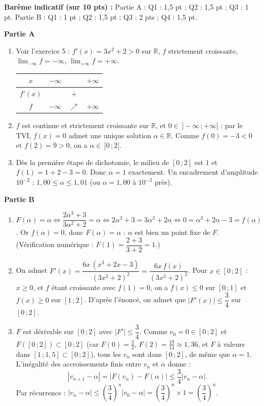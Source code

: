 \documentclass[11pt]{article}
\begin{document}
\begin{corrige}
\textbf{Barème indicatif (sur 10 pts) :} Partie A : Q1 : 1,5 pt ; Q2 : 1,5 pt ; Q3 : 1 pt. Partie B : Q1 : 1 pt ; Q2 : 1,5 pt ; Q3 : 2 pts ; Q4 : 1,5 pt.

\textbf{Partie A}
\begin{enumerate}
\item Voir l'exercice 5 : $f'(x)=3x^2+2>0$ sur $\mathbb{R}$, $f$ strictement croissante, $\lim_{-\infty}f=-\infty$, $\lim_{+\infty}f=+\infty$.
\begin{center}
\begin{tabular}{|c|ccc|}\hline
$x$ & $-\infty$ & & $+\infty$ \\ \hline
$f'(x)$ & & $+$ & \\ \hline
$f$ & $-\infty$ & $\nearrow$ & $+\infty$ \\ \hline
\end{tabular}
\end{center}

\item $f$ est continue et strictement croissante sur $\mathbb{R}$, et $0\in\,]-\infty\,;+\infty[$ : par le TVI, $f(x)=0$ admet une unique solution $\alpha\in\mathbb{R}$. Comme $f(0)=-3<0$ et $f(2)=9>0$, on a $\alpha\in\,]0\,;2[$.

\item Dès la première étape de dichotomie, le milieu de $[0\,;2]$ est $1$ et $f(1)=1+2-3=0$. Donc $\alpha=1$ exactement. Un encadrement d'amplitude $10^{-2}$ : $1{,}00\le\alpha\le 1{,}01$ (ou $\alpha=1{,}00$ à $10^{-2}$ près).
\end{enumerate}

\textbf{Partie B}
\begin{enumerate}
\item $F(\alpha)=\alpha \iff \dfrac{2\alpha^3+3}{3\alpha^2+2}=\alpha \iff 2\alpha^3+3=3\alpha^3+2\alpha \iff 0=\alpha^3+2\alpha-3=f(\alpha)$. Or $f(\alpha)=0$, donc $F(\alpha)=\alpha$ : $\alpha$ est bien un point fixe de $F$. (Vérification numérique : $F(1)=\dfrac{2+3}{3+2}=1$.)

\item On admet $F'(x)=\dfrac{6x\,(x^3+2x-3)}{(3x^2+2)^2}=\dfrac{6x\,f(x)}{(3x^2+2)^2}$.
Pour $x\in[0\,;2]$ : $x\ge 0$, et $f$ étant croissante avec $f(1)=0$, on a $f(x)\le 0$ sur $[0\,;1]$ et $f(x)\ge 0$ sur $[1\,;2]$.
D'après l'énoncé, on admet que $|F'(x)|\le \dfrac{3}{4}$ sur $[0\,;2]$.

\item $F$ est dérivable sur $[0\,;2]$ avec $|F'|\le \dfrac{3}{4}$. Comme $v_0=0\in[0\,;2]$ et $F([0\,;2])\subset[0\,;2]$ (car $F(0)=\frac{3}{2}$, $F(2)=\frac{19}{14}\approx 1{,}36$, et $F$ à valeurs dans $[1\,;1,5]\subset[0\,;2]$), tous les $v_n$ sont dans $[0\,;2]$, de même que $\alpha=1$. L'inégalité des accroissements finis entre $v_n$ et $\alpha$ donne :
\[ |v_{n+1}-\alpha|=|F(v_n)-F(\alpha)|\le \frac{3}{4}|v_n-\alpha|. \]
Par récurrence : $|v_n-\alpha|\le \left(\dfrac{3}{4}\right)^n|v_0-\alpha|=\left(\dfrac{3}{4}\right)^n\times 1=\left(\dfrac{3}{4}\right)^n$.


\end{enumerate}
\end{corrige}
\end{document}
